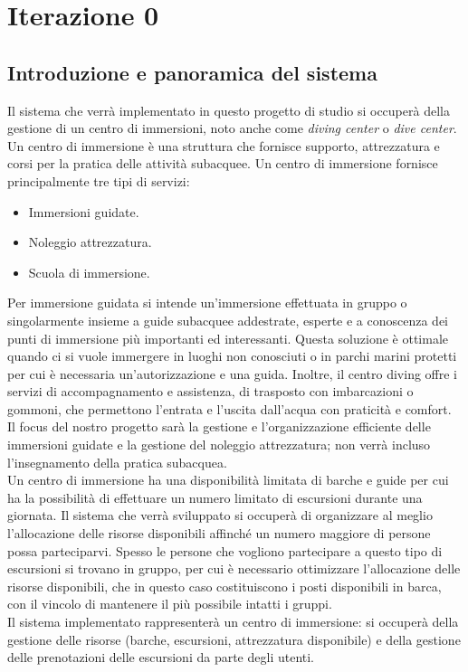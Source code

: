 \section{Iterazione 0}
\subsection{Introduzione e panoramica del sistema}
Il sistema che verrà implementato in questo progetto di studio si occuperà della gestione di un centro di immersioni, noto anche come \emph{diving center} o \emph{dive center}. Un centro di immersione è una struttura che fornisce supporto, attrezzatura e corsi per la pratica delle attività subacquee. Un centro di immersione fornisce principalmente tre tipi di servizi:
\begin{itemize}
    \item Immersioni guidate.
    \item Noleggio attrezzatura.
    \item Scuola di immersione.
\end{itemize}
Per immersione guidata si intende un'immersione effettuata in gruppo o singolarmente insieme a guide subacquee addestrate, esperte e a conoscenza dei punti di immersione più importanti ed interessanti. Questa soluzione è ottimale quando ci si vuole immergere in luoghi non conosciuti o in parchi marini protetti per cui è necessaria un'autorizzazione e una guida. Inoltre, il centro diving offre i servizi di accompagnamento e assistenza, di trasposto con imbarcazioni o gommoni, che permettono l'entrata e l'uscita dall'acqua con praticità e comfort.
\\
Il focus del nostro progetto sarà la gestione e l'organizzazione efficiente delle immersioni guidate e la gestione del noleggio attrezzatura; non verrà incluso l'insegnamento della pratica subacquea.
\\
Un centro di immersione ha una disponibilità limitata di barche e guide per cui ha la possibilità di effettuare un numero limitato di escursioni durante una giornata. Il sistema che verrà sviluppato si occuperà di organizzare al meglio l'allocazione delle risorse disponibili affinché un numero maggiore di persone possa parteciparvi. Spesso le persone che vogliono partecipare a questo tipo di escursioni si trovano in gruppo, per cui è necessario ottimizzare l'allocazione delle risorse disponibili, che in questo caso costituiscono i posti disponibili in barca, con il vincolo di mantenere il più possibile intatti i gruppi.
\\
Il sistema implementato rappresenterà un centro di immersione: si occuperà della gestione delle risorse (barche, escursioni, attrezzatura disponibile) e della gestione delle prenotazioni delle escursioni da parte degli utenti.
